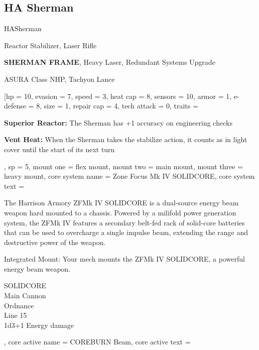 \subsection{HA Sherman}

\begin{mech}{HA}{Sherman}


\begin{license}
\item Reactor Stabilizer, Laser Rifle
\item \textbf{SHERMAN FRAME}, Heavy Laser, Redundant Systems Upgrade
\item ASURA Class NHP, Tachyon Lance
\end{license}

\frameBox
[hp = 10,
evasion = 7,
speed = 3,
heat cap = 8,
sensors = 10,
armor = 1,
e-defense = 8,
size = 1,
repair cap = 4,
tech attack = 0,
traits = {\textbf{Superior Reactor:} The Sherman has +1 accuracy on engineering checks

\textbf{Vent Heat:} When the Sherman takes the stabilize action, it counts as in light cover until the start of its next turn},
sp = 5,
mount one = flex mount,
mount two = main mount,
mount three = heavy mount,
core system name = Zone Focus Mk IV  SOLIDCORE,
core system text ={The Harrison Armory ZFMk IV SOLIDCORE is a dual-source energy beam weapon hard mounted to a chassis. Powered by a milifold power generation system, the ZFMk IV features a secondary belt-fed rack of solid-core batteries that can be used to overcharge a single impulse beam, extending the range and destructive power of the weapon.

Integrated Mount: Your mech mounts the ZFMk IV SOLIDCORE, a powerful energy beam weapon.

SOLIDCORE\\
Main Cannon\\
Ordnance\\
Line 15\\
1d3+1 Energy damage},
core active name = COREBURN Beam,
core active text = {\FullAction

}
\end{mech}
